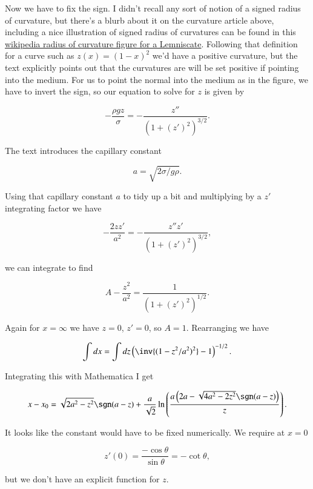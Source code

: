 Now we have to fix the sign.  I didn't recall any sort of notion of a signed radius of curvature, but there's a blurb about it on the curvature article above, including a nice illustration of signed radius of curvatures can be found in this \href{http://goo.gl/Wqzz2}{wikipedia radius of curvature figure for a Lemniscate}.  Following that definition for a curve such as $z(x) = (1-x)^2$ we'd have a positive curvature, but the text explicitly points out that the curvatures are will be set positive if pointing into the medium.  For us to point the normal into the medium as in the figure, we have to invert the sign, so our equation to solve for $z$ is given by

\begin{equation}\label{eqn:continuumFluidsReview:1710}
-\frac{\rho g z}{\sigma} = -\frac{z''}{(1 + (z')^2)^{3/2}}.
\end{equation}

The text introduces the capillary constant

\begin{equation}\label{eqn:continuumFluidsReview:1730}
a = \sqrt{2 \sigma/ g \rho}.
\end{equation}

Using that capillary constant $a$ to tidy up a bit and multiplying by a $z'$ integrating factor we have

\begin{equation}\label{eqn:continuumFluidsReview:1750}
-\frac{2 z z'}{a^2} = -\frac{z'' z'}{(1 + (z')^2)^{3/2}},
\end{equation}

we can integrate to find

\begin{equation}\label{eqn:continuumFluidsReview:1770}
A - \frac{z^2}{a^2} = \frac{1}{(1 + (z')^2)^{1/2}}.
\end{equation}

Again for $x = \infty$ we have $z = 0$, $z' = 0$, so $A = 1$.  Rearranging we have

\begin{equation}\label{eqn:continuumFluidsReview:1790}
\int dx = \int dz \left( \inv{(1 - z^2/a^2)^2} - 1 \right)^{-1/2}.
\end{equation}

Integrating this with Mathematica I get

\begin{equation}\label{eqn:continuumFluidsReview:1810}
x - x_0 =
\sqrt{2 a^2-z^2} \sgn(a-z)+ \frac{a}{\sqrt{2}} \ln \left(\frac{a \left(2 a-\sqrt{4 a^2-2 z^2} \sgn(a-z)\right)}{z}\right).
\end{equation}

It looks like the constant would have to be fixed numerically.  We require at $x = 0$

\begin{equation}\label{eqn:continuumFluidsReview:1830}
z'(0) = \frac{-\cos\theta}{\sin\theta} = -\cot \theta,
\end{equation}

but we don't have an explicit function for $z$.

